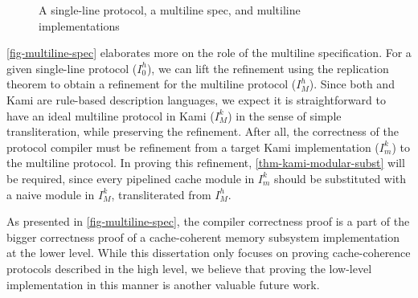 \begin{figure}[t]
  \centering
  \caption{A single-line protocol, a multiline spec, and multiline implementations}
  \label{fig-multiline-spec}
\end{figure}

\autoref{fig-multiline-spec} elaborates more on the role of the multiline specification.
For a given \hemiola{} single-line protocol ($I^{h}_{0}$), we can lift the refinement using the replication theorem to obtain a refinement for the multiline protocol ($I^{h}_{M}$).
Since both \hemiola{} and Kami are rule-based description languages, we expect it is straightforward to have an ideal multiline protocol in Kami ($I^{k}_{M}$) in the sense of simple transliteration, while preserving the refinement.
After all, the correctness of the protocol compiler must be refinement from a target Kami implementation ($I^{k}_{m}$) to the multiline protocol.
In proving this refinement, \autoref{thm-kami-modular-subst} will be required, since every pipelined cache module in $I^{k}_{m}$ should be substituted with a naive module in $I^{k}_{M}$, transliterated from $I^{h}_{M}$.

As presented in \autoref{fig-multiline-spec}, the compiler correctness proof is a part of the bigger correctness proof of a cache-coherent memory subsystem implementation at the lower level.
While this dissertation only focuses on proving cache-coherence protocols described in the high level, we believe that proving the low-level implementation in this manner is another valuable future work.

